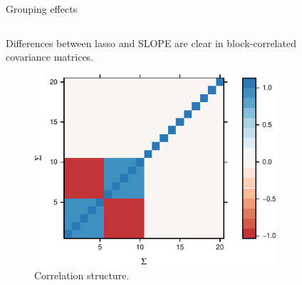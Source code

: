 \documentclass[10pt]{beamer}
\begin{document}
\begin{frame}{Grouping effects}
\begin{columns}
\begin{column}{0.45\linewidth}
    Differences between lasso and SLOPE are clear in block-correlated covariance matrices.
    
    \vspace{5ex}
    
    \begin{figure}
        \centering
        \includegraphics[width=0.8\linewidth]{figures/grouping-effect-sigma.pdf}
        \caption{Correlation structure.}
    \end{figure}
\end{column}
\begin{column}{0.45\linewidth}
    \begin{figure}
        \centering

\end{figure}
\end{column}
\end{columns}
\end{frame}
\end{document}
